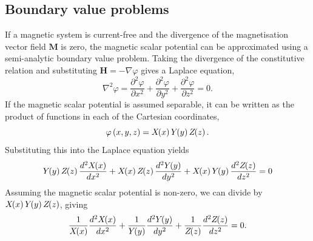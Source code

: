 \subsection{Boundary value problems}
If a magnetic system is current-free and the divergence of the magnetisation vector field \(\mathbf{M}\) is zero, the magnetic scalar potential can be approximated using a semi-analytic boundary value problem. Taking the divergence of the constitutive relation and substituting \(\mathbf{H} = -\nabla \varphi\) gives a Laplace equation,
\begin{equation}
    \nabla^2 \varphi = \frac{\partial^2 \varphi}{\partial x^2} + \frac{\partial^2 \varphi}{\partial y^2} + \frac{\partial^2 \varphi}{\partial z^2} = 0 \text{.}
\end{equation}
If the magnetic scalar potential is assumed separable, it can be written as the product of functions in each of the Cartesian coordinates,
\begin{equation}
    \varphi \left(x,y,z\right) = X\hspace{-1mm}\left(x\right)Y\hspace{-1mm}\left(y\right)Z\hspace{-1mm}\left(z\right) \text{.}
\end{equation}
Substituting this into the Laplace equation yields
\begin{equation}
    Y\hspace{-1mm}\left(y\right)Z\hspace{-1mm}\left(z\right)\frac{d^2 X\hspace{-1mm}\left(x\right)}{d x^2} + X\hspace{-1mm}\left(x\right)Z\hspace{-1mm}\left(z\right)\frac{d^2 Y\hspace{-1mm}\left(y\right)}{d y^2} + X\hspace{-1mm}\left(x\right)Y\hspace{-1mm}\left(y\right)\frac{d^2 Z\hspace{-1mm}\left(z\right)}{d z^2} = 0
\end{equation}
Assuming the magnetic scalar potential is non-zero, we can divide by \(X\hspace{-1mm}\left(x\right)Y\hspace{-1mm}\left(y\right)Z\hspace{-1mm}\left(z\right)\), giving
\begin{equation}
    \frac{1}{X\hspace{-1mm}\left(x\right)}\frac{d^2 X\hspace{-1mm}\left(x\right)}{d x^2} + \frac{1}{Y\hspace{-1mm}\left(y\right)}\frac{d^2 Y\hspace{-1mm}\left(y\right)}{d y^2} + \frac{1}{Z\hspace{-1mm}\left(z\right)}\frac{d^2 Z\hspace{-1mm}\left(z\right)}{d z^2} = 0 \text{.}
\end{equation}
